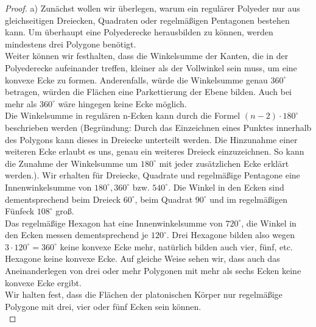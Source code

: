 \begin{proof}
a) Zunächst wollen wir überlegen, warum ein regulärer Polyeder nur aus gleichseitigen Dreiecken, Quadraten oder regelmäßigen Pentagonen bestehen kann. Um überhaupt eine Polyederecke herausbilden zu können, werden mindestens drei Polygone benötigt. \\
Weiter können wir festhalten, dass die Winkelsumme der Kanten, die in der Polyederecke aufeinander treffen, kleiner als der Vollwinkel sein muss, um eine konvexe Ecke zu formen. Anderenfalls, würde die Winkelsumme genau $360^\circ$ betragen, würden die Flächen eine Parkettierung der Ebene bilden. Auch bei mehr als $360^\circ$ wäre hingegen keine Ecke möglich.\\
Die Winkelsumme in regulären n-Ecken kann durch die Formel $(n-2)\cdot 180^\circ$ beschrieben werden (Begründung: Durch das Einzeichnen eines Punktes innerhalb des Polygons kann dieses in Dreiecke unterteilt werden. Die Hinzunahme einer weiteren Ecke erlaubt es uns, genau ein weiteres Dreieck einzuzeichnen. So kann die Zunahme der Winkelsumme um $180^\circ$ mit jeder zusätzlichen Ecke erklärt werden.). Wir erhalten für Dreiecke, Quadrate und regelmäßige Pentagone eine Innenwinkelsumme von $180^\circ, 360^\circ$ bzw. $540^\circ$. Die Winkel in den Ecken sind dementsprechend beim Dreieck $60^\circ$, beim Quadrat $90^\circ$ und im regelmäßigen Fünfeck $108^\circ$ groß. \\
Das regelmäßige Hexagon hat eine Innenwinkelsumme von $720^\circ$, die Winkel in den Ecken messen dementsprechend je $120^\circ$. Drei Hexagone bilden also wegen $3\cdot 120^\circ=360^\circ$ keine konvexe Ecke mehr, natürlich bilden auch vier, fünf, etc. Hexagone keine konvexe Ecke. Auf gleiche Weise sehen wir, dass auch das Aneinanderlegen von drei oder mehr Polygonen mit mehr als sechs Ecken keine konvexe Ecke ergibt.\\
Wir halten fest, dass die Flächen der platonischen Körper nur regelmäßige Polygone mit drei, vier oder fünf Ecken sein können.\\


\end{proof}
